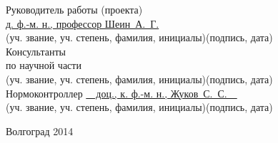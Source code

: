 \begin{titlepage}
\begin{flushleft}
Руководитель работы (проекта)\\
\underline{д. ф.-м. н., профессор Шеин~А.~Г.}\hfill\underline{\hspace{5cm}}\\
\vspace{-.2cm}\hspace{.4cm}\footnotesize(уч. звание, уч. степень, фамилия, инициалы)\hspace{6.5cm}(подпись, дата)\normalsize\\
Консультанты\\
по научной части \underline{\hspace{7cm}}\hfill\underline{\hspace{5cm}}\\
\vspace{-.2cm}\hspace{4cm}\footnotesize(уч. звание, уч. степень, фамилия, инициалы)\hspace{3cm}(подпись, дата)\normalsize\\
Нормоконтроллер \underline{\ \ доц., к. ф.-м. н., Жуков~С.~С.\ \ }\hfill\underline{\hspace{5cm}}\\
\vspace{-.2cm}\hspace{4cm}\footnotesize(уч. звание, уч. степень, фамилия, инициалы)\hspace{3cm}(подпись, дата)\normalsize\\
\end{flushleft}

\vspace{\fill}

\begin{center}
Волгоград 2014
\end{center}

\end{titlepage}

